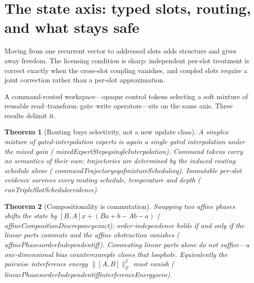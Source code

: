 \documentclass[11pt]{article}
\newtheorem{theorem}{Theorem}[section]
\newcommand{\leanname}[1]{{\scriptsize\ttfamily
  \def\_{\textunderscore\allowbreak}#1}}
\begin{document}
\section{The state axis: typed slots, routing, and what stays safe}
\label{sec:state}

Moving from one recurrent vector to addressed slots adds structure and gives away freedom.
The licensing condition is sharp: independent per-slot treatment is correct exactly when
the cross-slot coupling vanishes, and coupled slots require a joint correction rather than
a per-slot approximation.

A command-routed workspace---opaque control tokens selecting a soft mixture of reusable
read--transform--gate--write operators---sits on the same axis. Three results delimit it.

\begin{theorem}[Routing buys selectivity, not a new update class]
A simplex mixture of gated-interpolation experts is again a single gated interpolation
under the mixed gain (\leanname{mixedExpertStep\_eq\_singleInterpolation}). Command tokens
carry no semantics of their own: trajectories are determined by the induced routing
schedule alone (\leanname{commandTrajectory\_eq\_of\_mixtureSchedule\_eq}). Immutable
per-slot evidence survives every routing schedule, temperature and depth
(\leanname{runTripleSlotSchedule\_evidence}).
\end{theorem}

\begin{theorem}[Compositionality is commutation]
Swapping two affine phases shifts the state by $[B,A]x + (Ba+b-Ab-a)$
(\leanname{affineCompositionDiscrepancy\_exact}); order-independence holds if and only if
the linear parts commute \emph{and} the affine obstruction vanishes
(\leanname{affinePhases\_orderIndependent\_iff}). Commuting linear parts alone do not
suffice---a one-dimensional bias counterexample closes that loophole. Equivalently the
pairwise interference energy $\lVert[A,B]\rVert_F^{2}$ must vanish
(\leanname{linearPhases\_orderIndependent\_iff\_interferenceEnergy\_zero}).
\end{theorem}
\end{document}
